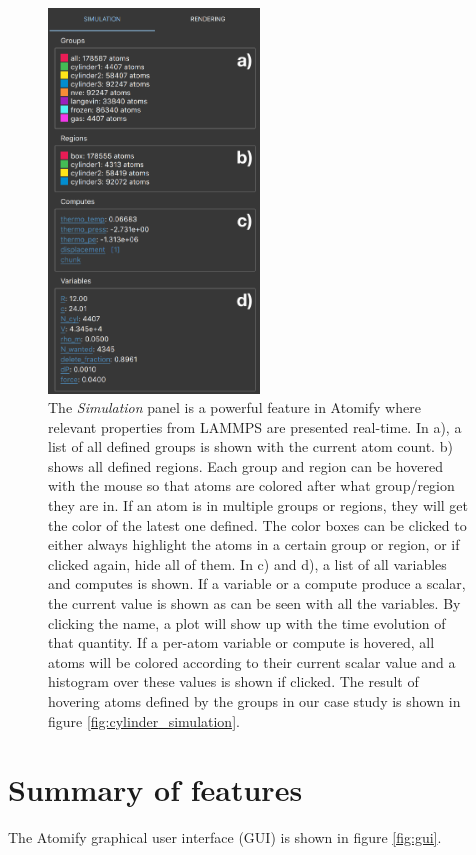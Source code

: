 \documentclass[12pt,a4paper,final]{iopart}
\begin{document}
\begin{figure}[htp!]
	\centering
	\includegraphics[width=0.5\textwidth]{figures/rightbar.pdf}
	\caption{
		The \textit{Simulation} panel is a powerful feature in Atomify where relevant
		properties from LAMMPS are presented real-time.
		In a), a list of all defined groups is shown with the current atom count.
		b) shows all defined regions. Each group and region can be hovered with the mouse so that atoms
		are colored after what group/region they are in. If an atom is in multiple
		groups or regions, they will get the color of the latest one defined.
		The color boxes can be clicked to either always highlight the atoms in a certain group or region,
		or if clicked again, hide all of them.
		In c) and d), a list of all variables and computes is shown. If a variable or a compute
		produce a scalar, the current value is shown as can be seen with all the variables.
		By clicking the name, a plot will show up with the time evolution of that quantity.
		If a per-atom variable or compute is hovered, all atoms will be colored according to their
		current scalar value and a histogram over these values is shown if clicked.
		The result of hovering atoms defined by the groups in our case study is shown in figure \ref{fig:cylinder_simulation}.
	}
	\label{fig:rightbar}
\end{figure}

\section{\label{sec:features}Summary of features}
The Atomify graphical user interface (GUI) is shown in figure \ref{fig:gui}.
\end{document}
